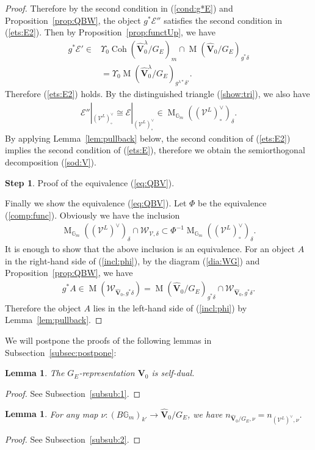 \documentclass [11pt,oneside,a4paper,mathscr]{amsart}
\newtheorem{lemma}[thm]{Lemma}
\theoremstyle{definition}
\newtheorem{step}{Step}
\newcommand{\E}{\mathcal{E}}
\newcommand{\V}{\mathcal{V}}
\newcommand{\MM}{\operatorname{M}}
\newcommand{\bgm}{B\mathbb{G}_m}
\newcommand{\Coh}{\operatorname{Coh}}
\begin{document}
\begin{proof}
Therefore by the second condition in (\ref{cond:g*E}) and Proposition~\ref{prop:QBW}, the object $g^* \mathcal{E}''$ satisfies the second condition in (\ref{ets:E2}). 
Then by Proposition~\ref{prop:functUp}, we have 
\begin{align*}
     g^{\ast}\mathcal{E}'\in &\Upsilon_0 \Coh(\widehat{\mathbf{V}}_0^{\lambda}/G_E)_m \cap 
     \MM(\widehat{\mathbf{V}}_0/G_E)_{g^{\ast}\delta} \\
     &=\Upsilon_0 \MM(\widehat{\mathbf{V}}_0^{\lambda}/G_E)_{g^{\lambda\ast}\delta'}.
\end{align*}
Therefore (\ref{ets:E2}) holds. 
By the distinguished triangle (\ref{show:tri}), we also have 
\begin{align*}
\E''|_{(\V^L)^{\vee}_{\circ}} \cong \E|_{(\V^L)^{\vee}_{\circ}} 
\in \MM_{\mathbb{G}_m}((\V^L)_{\circ}^{\vee})_{\delta}.     
\end{align*}
By applying Lemma~\ref{lem:pullback} below,  
the second condition of (\ref{ets:E2}) implies the second 
condition of (\ref{ets:E}), therefore we obtain the semiorthogonal 
decomposition (\ref{sod:V}). 

\begin{step}
Proof of the equivalence (\ref{eq:QBV}).
\end{step}
Finally we show the equivalence (\ref{eq:QBV}).
Let $\Phi$ be the equivalence (\ref{comp:func}).
Obviously we have the inclusion 
\begin{align}\label{incl:phi}
\MM_{\mathbb{G}_m}((\V^L)^{\vee})_{\delta} \cap \mathcal{W}_{\V, \delta}
\subset \Phi^{-1} \MM_{\mathbb{G}_m}((\V^L)^{\vee}_{\circ})_{\delta}.   
\end{align}
It is enough to show that the above inclusion is an equivalence. 
For an object $A$ in the right-hand side of (\ref{incl:phi}), 
by the diagram (\ref{dia:WG}) and Proposition~\ref{prop:QBW}, 
we have 
\begin{align*}
    g^{\ast}A \in
    \MM(\mathcal{W}_{\widehat{\mathbf{V}}_0, g^{\ast}\delta})=
    \MM(\widehat{\mathbf{V}}_0/G_E)_{g^{\ast}\delta} \cap 
    \mathcal{W}_{\widehat{\mathbf{V}}_0, g^{*}\delta}.
\end{align*}
Therefore the object $A$ lies in the left-hand 
side of (\ref{incl:phi}) by Lemma~\ref{lem:pullback}. 
\end{proof}

We will postpone the proofs of the following lemmas in Subsection~\ref{subsec:postpone}:

\begin{lemma}\label{lem:symW}
The $G_E$-representation $\mathbf{V}_0$ is self-dual. 
\end{lemma}
\begin{proof}
    See Subsection~\ref{subsub:1}.
\end{proof}
\begin{lemma}\label{lem:neq}
For any map $\nu \colon (\bgm)_{k'} \to \widehat{\mathbf{V}}_0/G_E$, 
we have 
$n_{\widehat{\mathbf{V}}_0/G_E, \nu}=n_{(\V^L)^{\vee}, \nu}$. 
\end{lemma}
\begin{proof}
    See Subsection~\ref{subsub:2}.
\end{proof}
\end{document}
